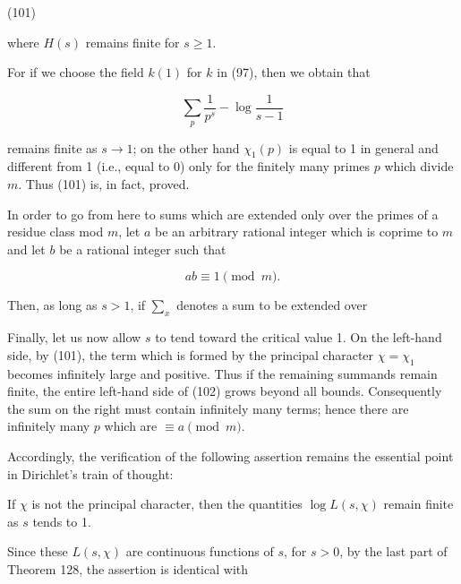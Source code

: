 (101)

where $H(s)$ remains finite for $s \geq 1$.

For if we choose the field $k(1)$ for $k$ in (97), then we obtain that

$$\sum_p \frac{1}{p^s} - \log \frac{1}{s-1}$$

remains finite as $s \rightarrow 1$; on the other hand $\chi_1(p)$ is equal to 1 in general and different from 1 (i.e., equal to 0) only for the finitely many primes $p$ which divide $m$. Thus (101) is, in fact, proved.

In order to go from here to sums which are extended only over the primes of a residue class mod $m$, let $a$ be an arbitrary rational integer which is coprime to $m$ and let $b$ be a rational integer such that

$$ab \equiv 1 \pmod{m}.$$

Then, as long as $s > 1$, if $\sum_x$ denotes a sum to be extended over

Finally, let us now allow $s$ to tend toward the critical value 1. On the left-hand side, by (101), the term which is formed by the principal character $\chi = \chi_1$ becomes infinitely large and positive. Thus if the remaining summands remain finite, the entire left-hand side of (102) grows beyond all bounds. Consequently the sum on the right must contain infinitely many terms; hence there are infinitely many $p$ which are $\equiv a \pmod{m}$.

Accordingly, the verification of the following assertion remains the essential point in Dirichlet’s train of thought:

If $\chi$ is not the principal character, then the quantities $\log L(s, \chi)$ remain finite as $s$ tends to 1.

Since these $L(s, \chi)$ are continuous functions of $s$, for $s > 0$, by the last part of Theorem 128, the assertion is identical with
